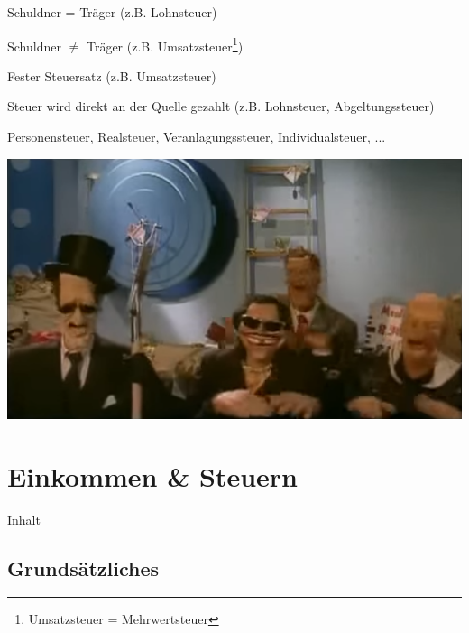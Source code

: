 \documentclass{beamer}
\begin{document}
			\begin{frame}
				\begin{description}
					\item[Direkte Steuer] Schuldner = Träger (z.B. Lohnsteuer)
					\item[Indirekte Steuer] Schuldner $\neq$ Träger (z.B. Umsatzsteuer\footnote{Umsatzsteuer = Mehrwertsteuer})
					\item[Pauschalsteuer] Fester Steuersatz (z.B. Umsatzsteuer)
					\item[Quellensteuer] Steuer wird direkt an der Quelle gezahlt (z.B. Lohnsteuer, Abgeltungssteuer)
				\end{description}\n
				Personensteuer, Realsteuer, Veranlagungssteuer, Individualsteuer, ...
			\end{frame}
			
			\begin{frame}
				\begin{center}
					\includegraphics[width=\textwidth]{images/steuersong.png}
				\end{center}
			\end{frame}
	
	\section{Einkommen \& Steuern}
	
		\begin{frame}[t]{Inhalt}
		\end{frame}
	
		\subsection{Grundsätzliches}
			
\end{document}
